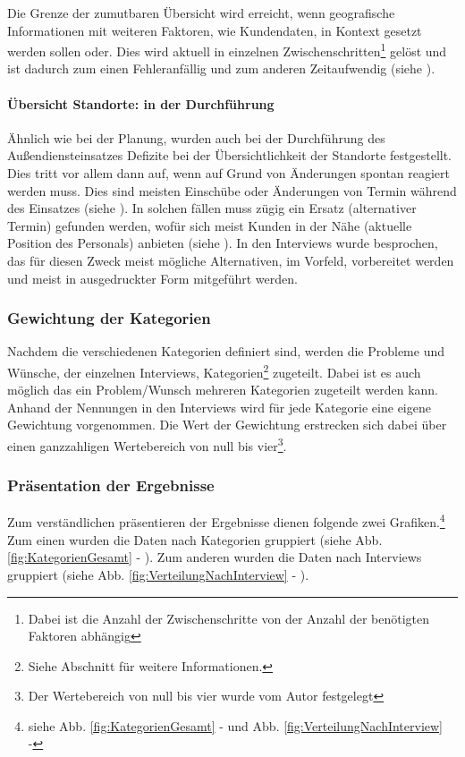 \documentclass[Bachelorarbeit.tex]{subfiles}
\begin{document}
Die Grenze der zumutbaren Übersicht wird erreicht, wenn geografische Informationen mit weiteren Faktoren, wie Kundendaten, in Kontext gesetzt werden sollen oder. 
Dies wird aktuell in einzelnen Zwischenschritten\footnote{Dabei ist die Anzahl der Zwischenschritte von der Anzahl der benötigten Faktoren abhängig} gelöst und ist dadurch zum einen Fehleranfällig und zum anderen Zeitaufwendig (siehe ).

\paragraph{Übersicht Standorte: in der Durchführung}
Ähnlich wie bei der Planung, wurden auch bei der Durchführung des Außendiensteinsatzes Defizite bei der Übersichtlichkeit der Standorte festgestellt. 
Dies tritt vor allem dann auf, wenn auf Grund von Änderungen spontan reagiert werden muss.
Dies sind meisten Einschübe oder Änderungen von Termin während des Einsatzes (siehe ). 
In solchen fällen muss zügig ein Ersatz (alternativer Termin) gefunden werden, wofür sich meist Kunden in der Nähe (aktuelle Position des Personals) anbieten (siehe ).
In den Interviews wurde besprochen, das für diesen Zweck meist mögliche Alternativen, im Vorfeld, vorbereitet werden und meist in ausgedruckter Form mitgeführt werden. 

\subsubsection{Gewichtung der Kategorien}
\label{analyse:gewichtung}

Nachdem die verschiedenen Kategorien definiert sind, werden die Probleme und Wünsche, der einzelnen Interviews, Kategorien\footnote{
	Siehe Abschnitt  für weitere Informationen.
	}
zugeteilt.
Dabei ist es auch möglich das ein Problem/Wunsch mehreren Kategorien zugeteilt werden kann.
Anhand der Nennungen in den Interviews wird für jede Kategorie eine eigene Gewichtung vorgenommen.
Die Wert der Gewichtung erstrecken sich dabei über einen ganzzahligen Wertebereich von null bis vier\footnote
{Der Wertebereich von null bis vier wurde vom Autor festgelegt}.

\subsubsection{Präsentation der Ergebnisse}
Zum verständlichen präsentieren der Ergebnisse dienen folgende zwei Grafiken.\footnote
	{siehe Abb. \ref{fig:KategorienGesamt} -  und Abb. \ref{fig:VerteilungNachInterview} - }
Zum einen wurden die Daten nach Kategorien gruppiert (siehe Abb. \ref{fig:KategorienGesamt} - ).
Zum anderen wurden die Daten nach Interviews gruppiert (siehe Abb. \ref{fig:VerteilungNachInterview} - ).
\end{document}

